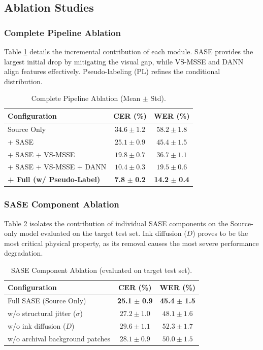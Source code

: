 \documentclass[11pt]{article}
\begin{document}
\subsection{Ablation Studies}

\subsubsection{Complete Pipeline Ablation}
Table \ref{tab:pipeline_ablation} details the incremental contribution of each module. SASE provides the largest initial drop by mitigating the visual gap, while VS-MSSE and DANN align features effectively. Pseudo-labeling (PL) refines the conditional distribution.

\begin{table}[htbp]
\centering
\caption{Complete Pipeline Ablation (Mean $\pm$ Std).}
\label{tab:pipeline_ablation}
\begin{tabular}{l c c}
\toprule
\textbf{Configuration} & \textbf{CER (\%)} & \textbf{WER (\%)} \\
\midrule
Source Only & $34.6 \pm 1.2$ & $58.2 \pm 1.8$ \\
+ SASE & $25.1 \pm 0.9$ & $45.4 \pm 1.5$ \\
+ SASE + VS-MSSE & $19.8 \pm 0.7$ & $36.7 \pm 1.1$ \\
+ SASE + VS-MSSE + DANN & $10.4 \pm 0.3$ & $19.5 \pm 0.6$ \\
\textbf{+ Full (w/ Pseudo-Label)} & \textbf{7.8} $\pm$ \textbf{0.2} & \textbf{14.2} $\pm$ \textbf{0.4} \\
\bottomrule
\end{tabular}
\end{table}

\subsubsection{SASE Component Ablation}
Table \ref{tab:sase_ablation} isolates the contribution of individual SASE components on the Source-only model evaluated on the target test set. Ink diffusion ($D$) proves to be the most critical physical property, as its removal causes the most severe performance degradation.

\begin{table}[htbp]
\centering
\caption{SASE Component Ablation (evaluated on target test set).}
\label{tab:sase_ablation}
\begin{tabular}{l c c}
\toprule
\textbf{Configuration} & \textbf{CER (\%)} & \textbf{WER (\%)} \\
\midrule
Full SASE (Source Only) & \textbf{25.1} $\pm$ \textbf{0.9} & \textbf{45.4} $\pm$ \textbf{1.5} \\
\midrule
w/o structural jitter ($\sigma$) & $27.2 \pm 1.0$ & $48.1 \pm 1.6$ \\
w/o ink diffusion ($D$) & $29.6 \pm 1.1$ & $52.3 \pm 1.7$ \\
w/o archival background patches & $28.1 \pm 0.9$ & $50.0 \pm 1.5$ \\
\bottomrule
\end{tabular}
\end{table}
\end{document}
